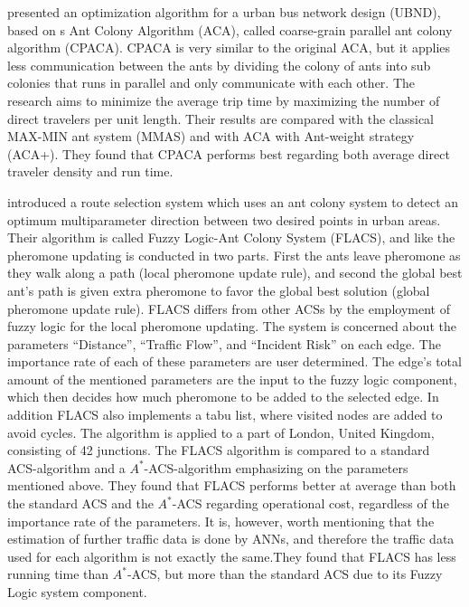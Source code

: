 \citet{yang07} presented an optimization algorithm for a urban bus network design (UBND), based on \citet{dorigo96}s Ant Colony Algorithm (ACA), called coarse-grain parallel ant colony algorithm (CPACA). CPACA is very similar to the original ACA, but it applies less communication between the ants by dividing the colony of ants into sub colonies that runs in parallel and only communicate with each other. The research aims to minimize the average trip time by maximizing the number of direct travelers per unit length. Their results are compared with the classical MAX-MIN ant system (MMAS)\citep{stutzle99} and with ACA with Ant-weight strategy (ACA+). They found that CPACA performs best regarding both average direct traveler density and run time. 

\citet{salehinejad10} introduced a route selection system which uses an ant colony system to detect an optimum multiparameter direction between two desired points in urban areas. Their algorithm is called Fuzzy Logic-Ant Colony System (FLACS), and like \citet{tripathi09} the pheromone updating is conducted in two parts. First the ants leave pheromone as they walk along a path (local pheromone update rule), and second the global best ant's path is given extra pheromone to favor the global best solution (global pheromone update rule). FLACS differs from other ACSs by the employment of fuzzy logic for the local pheromone updating. The system is concerned about the parameters ``Distance'', ``Traffic Flow'', and ``Incident Risk'' on each edge. The importance rate of each of these parameters are user determined. The edge's total amount of the mentioned parameters are the input to the fuzzy logic component, which then decides how much pheromone to be added to the selected edge. In addition FLACS also implements a tabu list, where visited nodes are added to avoid cycles. The algorithm is applied to a part of London, United Kingdom, consisting of 42 junctions. The FLACS algorithm is compared to a standard ACS-algorithm and a $A^*$-ACS-algorithm emphasizing on the parameters mentioned above. They found that FLACS performs better at average than both the standard ACS and the $A^*$-ACS regarding operational cost, regardless of the importance rate of the parameters. It is, however, worth mentioning that the estimation of further traffic data is done by ANNs, and therefore the traffic data used for each algorithm is not exactly the same.They found that FLACS has less running time than $A^*$-ACS, but more than the standard ACS due to its Fuzzy Logic system component. 

